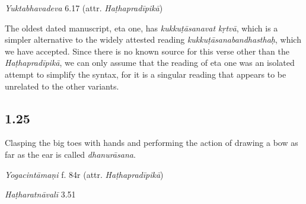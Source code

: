 \begin{ekdosis}
\begin{testimonia}[hp01_024]
\emph{Yuktabhavadeva} 6.17 (attr. \emph{Haṭhapradīpikā})

\begin{versinnote}
\end{versinnote}

\end{testimonia}

\begin{philcomm}[hp01_024]
The oldest dated manuscript, eta one, has \emph{kukkuṭāsanavat kṛtvā}, which is a simpler alternative to the widely attested reading \emph{kukkuṭāsanabandhasthaḥ}, which we have accepted. Since there is no known source for this verse other than the \emph{Haṭhapradīpikā}, we can only assume that the reading of eta one was an isolated attempt to simplify the syntax, for it is a singular reading that appears to be unrelated to the other variants.
\end{philcomm}

\subsection*{1.25}
\begin{translation}[hp01_025]
Clasping the big toes with hands and performing the action of drawing a bow as far as the ear is called \emph{dhanurāsana}.
\end{translation}

\begin{testimonia}[hp01_025]
\emph{Yogacintāmaṇi} f. 84r (attr. \emph{Haṭhapradīpikā})

\begin{versinnote}
\end{versinnote}

\emph{Haṭharatnāvalī} 3.51

\begin{versinnote}
\tl{\var{ākarṣaṇaṃ kṛtvā ] ākarṣaṇākṛṣṭaṃ P,T,t1}\\!}
\end{versinnote}


\end{testimonia}
\end{ekdosis}
